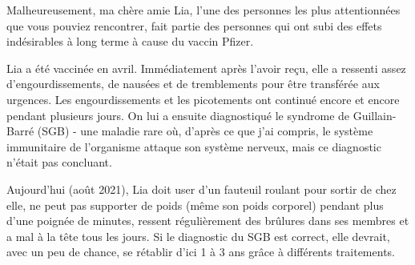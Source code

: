 Malheureusement, ma chère amie Lia, l'une des personnes les plus attentionnées
que vous pouviez rencontrer, fait partie des personnes qui ont subi des effets
indésirables à long terme à cause du vaccin Pfizer.

Lia a été vaccinée en avril. Immédiatement après l'avoir reçu, elle a ressenti
assez d'engourdissements, de nausées et de tremblements pour être transférée aux
urgences. Les engourdissements et les picotements ont continué encore et encore
pendant plusieurs jours. On lui a ensuite diagnostiqué le syndrome de
Guillain-Barré (SGB) - une maladie rare où, d'après ce que j'ai compris, le
système immunitaire de l'organisme attaque son système nerveux, mais ce
diagnostic n'était pas concluant.

Aujourd'hui (août 2021), Lia doit user d'un fauteuil roulant pour sortir de chez
elle, ne peut pas supporter de poids (même son poids corporel) pendant plus
d'une poignée de minutes, ressent régulièrement des brûlures dans ses membres et
a mal à la tête tous les jours. Si le diagnostic du SGB est correct, elle
devrait, avec un peu de chance, se rétablir d'ici 1 à 3 ans grâce à différents
traitements.

